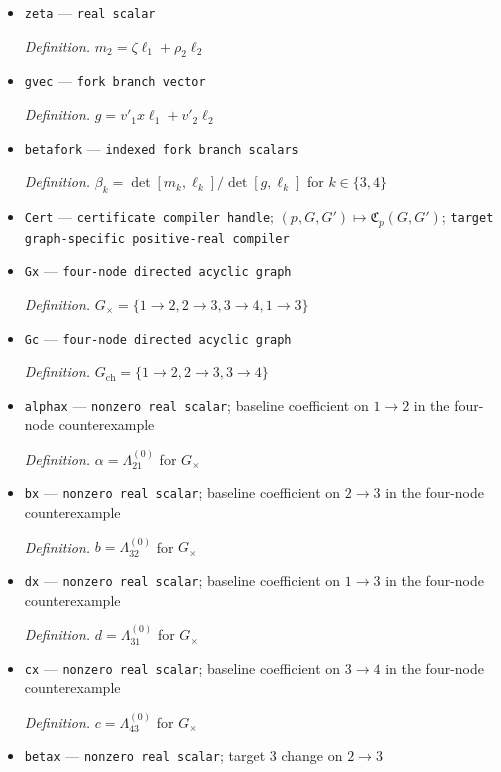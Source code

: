 \documentclass{article}
\begin{document}
\begin{itemize}
  \item \texttt{zeta} --- \texttt{real scalar}
  \par\smallskip\noindent\emph{Definition.} \(m_2=\zeta\ell_1+\rho_2\ell_2\)
  \item \texttt{gvec} --- \texttt{fork branch vector}
  \par\smallskip\noindent\emph{Definition.} \(g=v'_1x\ell_1+v'_2\ell_2\)
  \item \texttt{betafork} --- \texttt{indexed fork branch scalars}
  \par\smallskip\noindent\emph{Definition.} \(\beta_k=\det[m_k,\ell_k]/\det[g,\ell_k]\) for \(k\in\{3,4\}\)
  \item \texttt{Cert} --- \texttt{certificate compiler handle}; \((p,G,G')\mapsto\mathfrak C_p(G,G')\); \texttt{target graph-\allowbreak{}specific positive-\allowbreak{}real compiler}
  \item \texttt{Gx} --- \texttt{four-\allowbreak{}node directed acyclic graph}
  \par\smallskip\noindent\emph{Definition.} \(G_{\times}=\{1\to2,2\to3,3\to4,1\to3\}\)
  \item \texttt{Gc} --- \texttt{four-\allowbreak{}node directed acyclic graph}
  \par\smallskip\noindent\emph{Definition.} \(G_{\mathrm{ch}}=\{1\to2,2\to3,3\to4\}\)
  \item \texttt{alphax} --- \texttt{nonzero real scalar}; baseline coefficient on \(1\to2\) in the four-node counterexample
  \par\smallskip\noindent\emph{Definition.} \(\alpha=\Lambda^{(0)}_{21}\) for \(G_{\times}\)
  \item \texttt{bx} --- \texttt{nonzero real scalar}; baseline coefficient on \(2\to3\) in the four-node counterexample
  \par\smallskip\noindent\emph{Definition.} \(b=\Lambda^{(0)}_{32}\) for \(G_{\times}\)
  \item \texttt{dx} --- \texttt{nonzero real scalar}; baseline coefficient on \(1\to3\) in the four-node counterexample
  \par\smallskip\noindent\emph{Definition.} \(d=\Lambda^{(0)}_{31}\) for \(G_{\times}\)
  \item \texttt{cx} --- \texttt{nonzero real scalar}; baseline coefficient on \(3\to4\) in the four-node counterexample
  \par\smallskip\noindent\emph{Definition.} \(c=\Lambda^{(0)}_{43}\) for \(G_{\times}\)
  \item \texttt{betax} --- \texttt{nonzero real scalar}; target \(3\) change on \(2\to3\)

\end{itemize}
\end{document}
